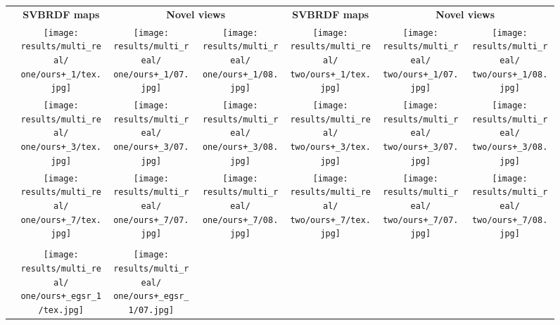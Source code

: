 \renewcommand{\one}{real_plastic-red-carton}
\renewcommand{\two}{real_cards-red}

\setlength{\raiseLen}{0.23in}
\setlength{\resLen}{0.52in}
\begin{figure*}[t]
	\addtolength{\tabcolsep}{-4pt}
	\begin{tabular}{cccc@{\hspace{4\tabcolsep}}ccc}
		& \textbf{\small SVBRDF maps} &
		\multicolumn{2}{c}{\textbf{\small Novel views}} &
		\textbf{\small SVBRDF maps} &
		\multicolumn{2}{c}{\textbf{\small Novel views}}
		\\
		\raisebox{\raiseLen}{\rotatebox[origin=c]{90}{\footnotesize{Ours (1)}}} &
		\texttt{[image: results/multi\_real/\\one/ours+\_1/tex.jpg]} &
		\texttt{[image: results/multi\_real/\\one/ours+\_1/07.jpg]} &
		\texttt{[image: results/multi\_real/\\one/ours+\_1/08.jpg]} &
		\texttt{[image: results/multi\_real/\\two/ours+\_1/tex.jpg]} &
		\texttt{[image: results/multi\_real/\\two/ours+\_1/07.jpg]} &
		\texttt{[image: results/multi\_real/\\two/ours+\_1/08.jpg]}
		\\
		\raisebox{\raiseLen}{\rotatebox[origin=c]{90}{\footnotesize{Ours (3)}}} &
		\texttt{[image: results/multi\_real/\\one/ours+\_3/tex.jpg]} &
		\texttt{[image: results/multi\_real/\\one/ours+\_3/07.jpg]} &
		\texttt{[image: results/multi\_real/\\one/ours+\_3/08.jpg]} &
		\texttt{[image: results/multi\_real/\\two/ours+\_3/tex.jpg]} &
		\texttt{[image: results/multi\_real/\\two/ours+\_3/07.jpg]} &
		\texttt{[image: results/multi\_real/\\two/ours+\_3/08.jpg]}
		\\
		\raisebox{\raiseLen}{\rotatebox[origin=c]{90}{\footnotesize{Ours (7)}}} &
		\texttt{[image: results/multi\_real/\\one/ours+\_7/tex.jpg]} &
		\texttt{[image: results/multi\_real/\\one/ours+\_7/07.jpg]} &
		\texttt{[image: results/multi\_real/\\one/ours+\_7/08.jpg]} &
		\texttt{[image: results/multi\_real/\\two/ours+\_7/tex.jpg]} &
		\texttt{[image: results/multi\_real/\\two/ours+\_7/07.jpg]} &
		\texttt{[image: results/multi\_real/\\two/ours+\_7/08.jpg]}
		\\
		\hline\\[-8pt]
		\raisebox{\raiseLen}{\rotatebox[origin=c]{90}{\footnotesize{Ours+ (1)}}} &
		\texttt{[image: results/multi\_real/\\one/ours+\_egsr\_1/tex.jpg]} &
		\texttt{[image: results/multi\_real/\\one/ours+\_egsr\_1/07.jpg]} &

\end{tabular}
\end{figure*}
